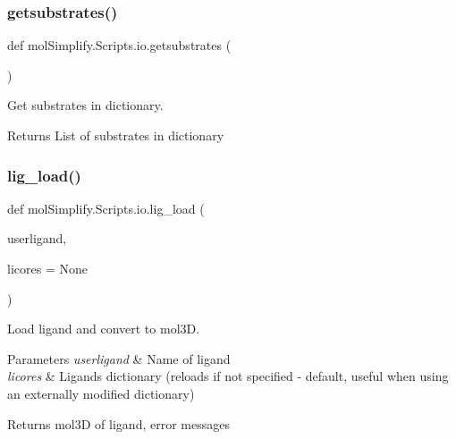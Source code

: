 \subsubsection{\texorpdfstring{getsubstrates()}{getsubstrates()}}
{\footnotesize\ttfamily def mol\+Simplify.\+Scripts.\+io.\+getsubstrates (\begin{DoxyParamCaption}{ }\end{DoxyParamCaption})}



Get substrates in dictionary. 

\begin{DoxyReturn}{Returns}
List of substrates in dictionary 
\end{DoxyReturn}
\mbox{\label{namespacemolSimplify_1_1Scripts_1_1io_ae7d8c9d78258b791b5e30d8610c65044}} 
\subsubsection{\texorpdfstring{lig\+\_\+load()}{lig\_load()}}
{\footnotesize\ttfamily def mol\+Simplify.\+Scripts.\+io.\+lig\+\_\+load (\begin{DoxyParamCaption}\item[{}]{userligand,  }\item[{}]{licores = {\ttfamily None} }\end{DoxyParamCaption})}



Load ligand and convert to mol3D. 


\begin{DoxyParams}{Parameters}
{\em userligand} & Name of ligand \\
\hline
{\em licores} & Ligands dictionary (reloads if not specified -\/ default, useful when using an externally modified dictionary) \\
\hline
\end{DoxyParams}
\begin{DoxyReturn}{Returns}
mol3D of ligand, error messages 
\end{DoxyReturn}
\mbox{\label{namespacemolSimplify_1_1Scripts_1_1io_a9b697216ad214b0fb51a6228c062bd9a}} 
